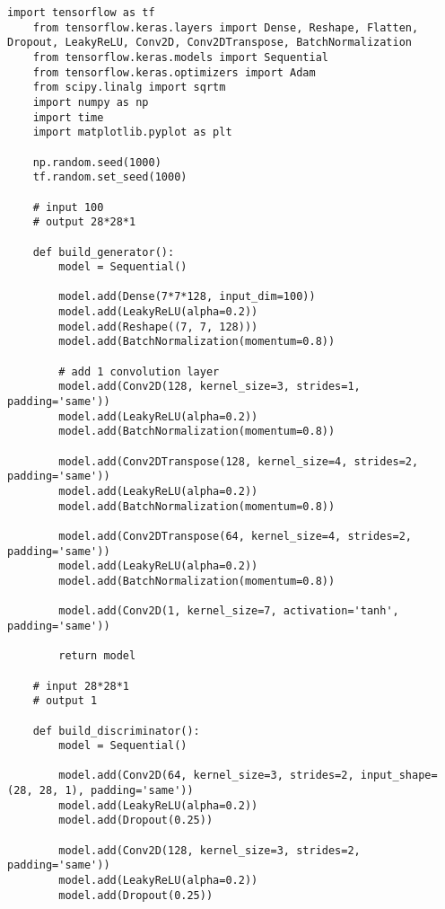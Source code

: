 \begin{lstlisting}[style=mypython, caption= {Explore GAN with 4 Convolutional Layers in Generator \\ and 3 Convolutional Layers in Discriminator}]
    import tensorflow as tf
    from tensorflow.keras.layers import Dense, Reshape, Flatten, Dropout, LeakyReLU, Conv2D, Conv2DTranspose, BatchNormalization
    from tensorflow.keras.models import Sequential
    from tensorflow.keras.optimizers import Adam
    from scipy.linalg import sqrtm
    import numpy as np
    import time
    import matplotlib.pyplot as plt
    
    np.random.seed(1000)
    tf.random.set_seed(1000)
    
    # input 100
    # output 28*28*1
    
    def build_generator():
        model = Sequential()
        
        model.add(Dense(7*7*128, input_dim=100))
        model.add(LeakyReLU(alpha=0.2))
        model.add(Reshape((7, 7, 128)))
        model.add(BatchNormalization(momentum=0.8))
    
        # add 1 convolution layer
        model.add(Conv2D(128, kernel_size=3, strides=1, padding='same'))
        model.add(LeakyReLU(alpha=0.2))
        model.add(BatchNormalization(momentum=0.8))
    
        model.add(Conv2DTranspose(128, kernel_size=4, strides=2, padding='same'))
        model.add(LeakyReLU(alpha=0.2))
        model.add(BatchNormalization(momentum=0.8))
    
        model.add(Conv2DTranspose(64, kernel_size=4, strides=2, padding='same'))
        model.add(LeakyReLU(alpha=0.2))
        model.add(BatchNormalization(momentum=0.8))
    
        model.add(Conv2D(1, kernel_size=7, activation='tanh', padding='same'))
    
        return model
    
    # input 28*28*1
    # output 1
    
    def build_discriminator():
        model = Sequential()
        
        model.add(Conv2D(64, kernel_size=3, strides=2, input_shape=(28, 28, 1), padding='same'))
        model.add(LeakyReLU(alpha=0.2))
        model.add(Dropout(0.25))
    
        model.add(Conv2D(128, kernel_size=3, strides=2, padding='same'))
        model.add(LeakyReLU(alpha=0.2))
        model.add(Dropout(0.25))
    

\end{lstlisting}
